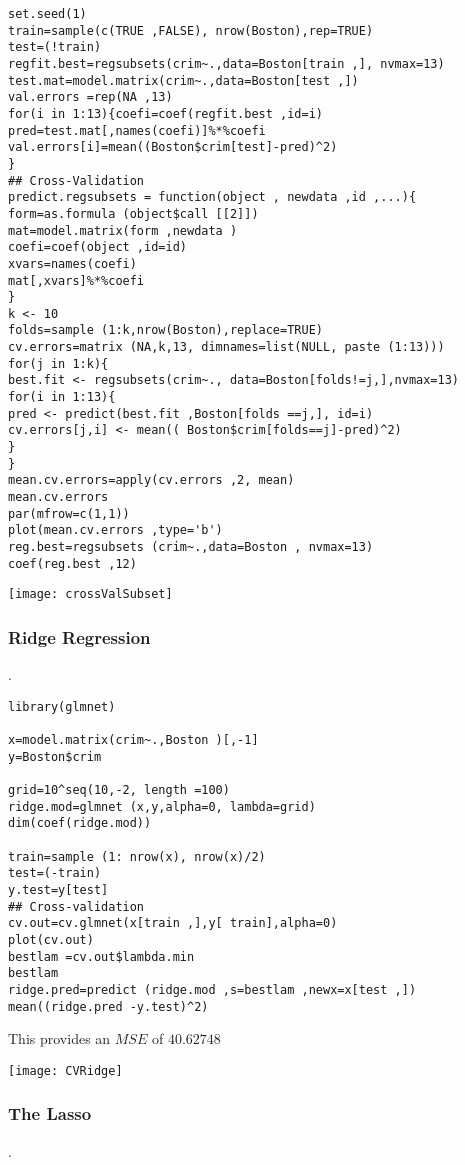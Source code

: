\documentclass[a4paper,man,natbib]{apa6}
\begin{document}
\begin{verbatim}
set.seed(1)
train=sample(c(TRUE ,FALSE), nrow(Boston),rep=TRUE)
test=(!train)
regfit.best=regsubsets(crim~.,data=Boston[train ,], nvmax=13)
test.mat=model.matrix(crim~.,data=Boston[test ,])
val.errors =rep(NA ,13)
for(i in 1:13){coefi=coef(regfit.best ,id=i)
pred=test.mat[,names(coefi)]%*%coefi
val.errors[i]=mean((Boston$crim[test]-pred)^2)
}
## Cross-Validation
predict.regsubsets = function(object , newdata ,id ,...){
form=as.formula (object$call [[2]])
mat=model.matrix(form ,newdata )
coefi=coef(object ,id=id)
xvars=names(coefi)
mat[,xvars]%*%coefi
}
k <- 10
folds=sample (1:k,nrow(Boston),replace=TRUE)
cv.errors=matrix (NA,k,13, dimnames=list(NULL, paste (1:13)))
for(j in 1:k){
best.fit <- regsubsets(crim~., data=Boston[folds!=j,],nvmax=13)
for(i in 1:13){
pred <- predict(best.fit ,Boston[folds ==j,], id=i)
cv.errors[j,i] <- mean(( Boston$crim[folds==j]-pred)^2)
}
}
mean.cv.errors=apply(cv.errors ,2, mean)
mean.cv.errors
par(mfrow=c(1,1))
plot(mean.cv.errors ,type='b')
reg.best=regsubsets (crim~.,data=Boston , nvmax=13)
coef(reg.best ,12)
\end{verbatim}

\texttt{[image: crossValSubset]}

\clearpage
\subsubsection{Ridge Regression}.\\

\begin{verbatim}
library(glmnet)

x=model.matrix(crim~.,Boston )[,-1]
y=Boston$crim

grid=10^seq(10,-2, length =100)
ridge.mod=glmnet (x,y,alpha=0, lambda=grid)
dim(coef(ridge.mod))

train=sample (1: nrow(x), nrow(x)/2)
test=(-train)
y.test=y[test]
## Cross-validation
cv.out=cv.glmnet(x[train ,],y[ train],alpha=0)
plot(cv.out)
bestlam =cv.out$lambda.min
bestlam
ridge.pred=predict (ridge.mod ,s=bestlam ,newx=x[test ,])
mean((ridge.pred -y.test)^2)
\end{verbatim}

This provides an $MSE$ of $40.62748$

\texttt{[image: CVRidge]}

\subsubsection{The Lasso}.\\
\end{document}

